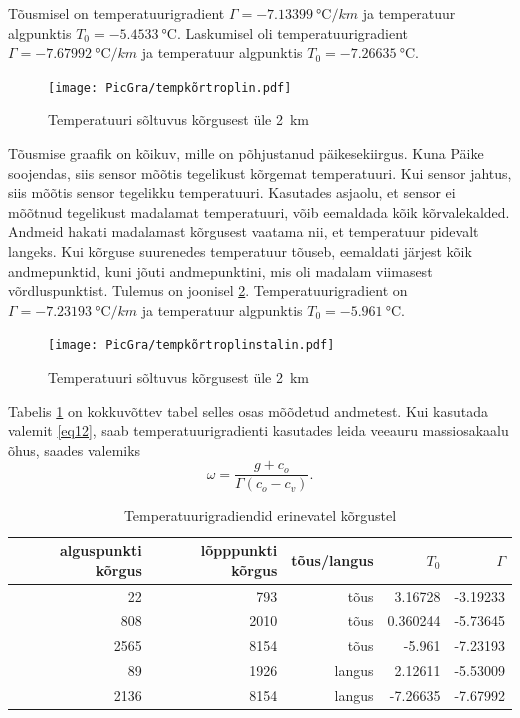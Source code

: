 \documentclass{trkut}%
\begin{document}
Tõusmisel on temperatuurigradient $\Gamma =\SI{-7.13399}{\degreeCelsius/km}$ ja temperatuur algpunktis $T_0 = \SI{-5.4533}{\celsius}$. Laskumisel oli temperatuurigradient $\Gamma =\SI{-7.67992}{\degreeCelsius/km}$ ja temperatuur algpunktis $T_0 = \SI{-7.26635}{\celsius}$.

\begin{figure}[h]
	\texttt{[image: PicGra/tempkõrtroplin.pdf]}
	\caption{Temperatuuri sõltuvus kõrgusest üle \SI{2}{km}}
	\label{tempkõrtroplin}%
\end{figure}

Tõusmise graafik on kõikuv, mille on põhjustanud päikesekiirgus. Kuna Päike soojendas, siis sensor mõõtis tegelikust kõrgemat temperatuuri. Kui sensor jahtus, siis mõõtis sensor tegelikku temperatuuri. Kasutades asjaolu, et sensor ei mõõtnud tegelikust madalamat temperatuuri, võib eemaldada kõik kõrvalekalded. Andmeid hakati madalamast kõrgusest vaatama nii, et temperatuur pidevalt langeks. Kui kõrguse suurenedes temperatuur tõuseb, eemaldati järjest kõik andmepunktid, kuni jõuti andmepunktini, mis oli madalam viimasest võrdluspunktist. Tulemus on joonisel \ref{tempkõrtroplinstalin}. Temperatuurigradient on $\Gamma =\SI{-7.23193}{\degreeCelsius/km}$ ja temperatuur algpunktis $T_0 = \SI{-5.961}{\celsius}$.

\begin{figure}[h]
	\texttt{[image: PicGra/tempkõrtroplinstalin.pdf]}
 	\caption{Temperatuuri sõltuvus kõrgusest üle \SI{2}{km}}
 	\label{tempkõrtroplinstalin}%
\end{figure}

Tabelis \ref{tabel1} on kokkuvõttev tabel selles osas mõõdetud andmetest. Kui kasutada valemit \ref{eq12}, saab temperatuurigradienti kasutades leida veeauru massiosakaalu õhus, saades valemiks
\begin{equation*}
\omega = \frac{g + c_o}{\Gamma(c_o-c_v)}.
\end{equation*}
\begin{table}[htb]
	\caption{Temperatuurigradiendid erinevatel kõrgustel}
	\label{tabel1}
	\begin{tabular}{r|r|r|r|r}
		\hline
		alguspunkti kõrgus & lõpppunkti kõrgus & tõus/langus & $T_0$ & $\Gamma$ \\
		\hline
		22 & 793 & tõus & 3.16728 & -3.19233 \\
		808 & 2010 & tõus & 0.360244 & -5.73645 \\
		2565 & 8154 & tõus & -5.961 & -7.23193 \\
		89 & 1926 & langus & 2.12611 & -5.53009 \\
		2136 & 8154 & langus & -7.26635 & -7.67992
	\end{tabular}
\end{table}
\end{document}
